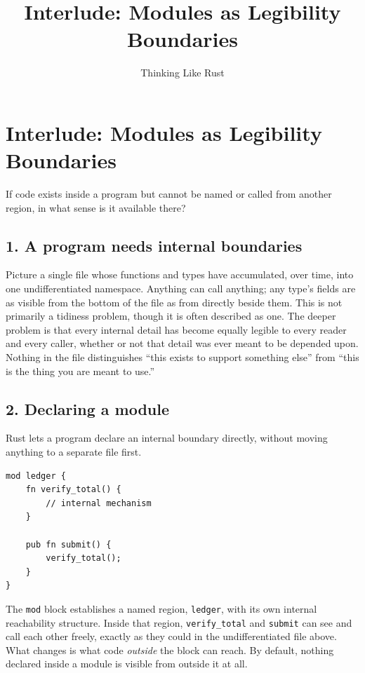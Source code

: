 \documentclass[11pt]{book}
\title{Interlude: Modules as Legibility Boundaries}
\author{Thinking Like Rust}
\date{}
\begin{document}
\chapter*{Interlude: Modules as Legibility Boundaries}

\begin{firstprinciples}
If code exists inside a program but cannot be named or called from another region, in what sense is it available there?
\end{firstprinciples}

\section*{1. A program needs internal boundaries}

Picture a single file whose functions and types have accumulated, over time, into one undifferentiated namespace. Anything can call anything; any type's fields are as visible from the bottom of the file as from directly beside them. This is not primarily a tidiness problem, though it is often described as one. The deeper problem is that every internal detail has become equally legible to every reader and every caller, whether or not that detail was ever meant to be depended upon. Nothing in the file distinguishes ``this exists to support something else'' from ``this is the thing you are meant to use.''

\section*{2. Declaring a module}

Rust lets a program declare an internal boundary directly, without moving anything to a separate file first.

\begin{lstlisting}
mod ledger {
    fn verify_total() {
        // internal mechanism
    }

    pub fn submit() {
        verify_total();
    }
}
\end{lstlisting}

The \texttt{mod} block establishes a named region, \texttt{ledger}, with its own internal reachability structure. Inside that region, \texttt{verify\_total} and \texttt{submit} can see and call each other freely, exactly as they could in the undifferentiated file above. What changes is what code \emph{outside} the block can reach. By default, nothing declared inside a module is visible from outside it at all.
\end{document}
